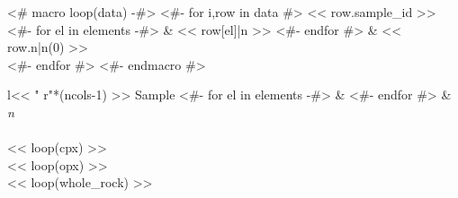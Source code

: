 <# macro loop(data) -#>
  <#- for i,row in data #>
    << row.sample_id >>
    <#- for el in elements -#>
    & << row[el]|n >>
    <#- endfor #> & << row.n|n(0) >> \\
  <#- endfor #>
<#- endmacro #>
\begin{tabular}{l<< " r"*(ncols-1) >>}
\toprule
  Sample
  <#- for el in elements -#>
  & 
  <#- endfor #> & \textit{n} \\
\midrule
   \\
\midrule
<< loop(cpx) >>
\midrule
   \\
\midrule
<< loop(opx) >>
\midrule
   \\
\midrule
<< loop(whole_rock) >>
\bottomrule
\end{tabular}


